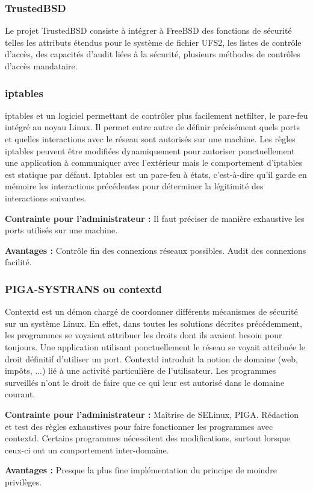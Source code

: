 \subsubsection{TrustedBSD}

Le projet TrustedBSD consiste à intégrer à FreeBSD des fonctions de sécurité telles les attributs étendus pour le système de fichier UFS2, les listes de contrôle d'accès, des capacités d'audit liées à la sécurité, plusieurs méthodes de contrôles d'accès mandataire.

\subsubsection{iptables}

iptables et un logiciel permettant de contrôler plus facilement netfilter, le pare-feu intégré au noyau Linux. Il permet entre autre de définir précisément quels ports et quelles interactions avec le réseau sont autorisés sur une machine. Les règles iptables peuvent être modifiées dynamiquement pour autoriser ponctuellement une application à communiquer avec l'extérieur mais le comportement d'iptables est statique par défaut. Iptables est un pare-feu à états, c'est-à-dire qu'il garde en mémoire les interactions précédentes pour déterminer la légitimité des interactions suivantes.
\begin{list}{}{}
 \item \textbf{Contrainte pour l'administrateur :} Il faut préciser de manière exhaustive les ports utilisés sur une machine.
 \item \textbf{Avantages :} Contrôle fin des connexions réseaux possibles. Audit des connexions facilité.
\end{list}

\subsubsection{PIGA-SYSTRANS ou contextd}

Contextd est un démon chargé de coordonner différents mécanismes de sécurité sur un système Linux. En effet, dans toutes les solutions décrites précédemment, les programmes se voyaient attribuer les droits dont ils avaient besoin pour toujours. Une application utilisant ponctuellement le réseau se voyait attribuée le droit définitif d'utiliser un port. Contextd introduit la notion de domaine (web, impôts, ...) lié à une activité particulière de l'utilisateur. Les programmes surveillés n'ont le droit de faire que ce qui leur est autorisé dans le domaine courant.
\begin{list}{}{}
 \item \textbf{Contrainte pour l'administrateur :} Maîtrise de SELinux, PIGA. Rédaction et test des règles exhaustives pour faire fonctionner les programmes avec contextd. Certains programmes nécessitent des modifications, surtout lorsque ceux-ci ont un comportement inter-domaine.
 \item \textbf{Avantages :} Presque la plus fine implémentation du principe de moindre privilèges.
\end{list}

